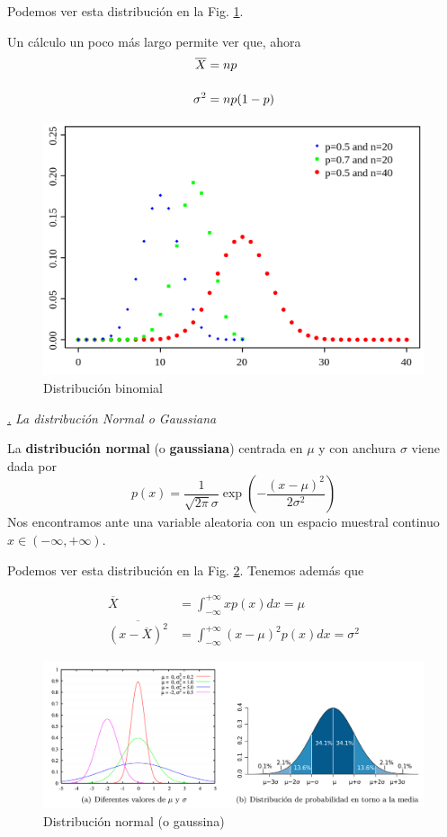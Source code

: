 \documentclass[a4paper,11pt]{book} %
\numberwithin{equation}{chapter}
\def\subsubiContadorIt{\par\addtocounter{subsubsection}{1}\underline{\it\thesubsubsection.}\hskip0.5cm \setcounter{subsubsubsectionIt}{0}}
\newcommand{\SubsubiIt}[1]{
		\subsubiContadorIt \textit{#1}
	}
\newcounter{subsubsubsectionIt}[subsubsection]
\begin{document}
Podemos ver esta distribución en la Fig. \ref{Fig_formalismo_dist_binomial}.

Un cálculo un poco más largo permite ver que, ahora
	\begin{equation} 
\begin{aligned}
	\overline X &=  np\\ \rule{0mm}{7mm}
	\sigma^2 &= n p(1-p)
	\end{aligned}
\end{equation}

	\begin{figure}[H]
	\centering 
	\includegraphics[width=0.4\linewidth]{Figuras/Fig_formalismo_dist_binomial.png}
	\caption{Distribución binomial}
	\label{Fig_formalismo_dist_binomial}
	\end{figure}

			\SubsubiIt{La distribución Normal o Gaussiana}

\begin{mybox_gray2}{}
La \textbf{distribución normal} (o \textbf{gaussiana}) centrada en $\mu$ y con anchura $\sigma$ viene dada por
	\begin{equation}
	p(x) = \frac{1}{\sqrt{2\pi}\sigma} \exp \left({-\frac{(x-\mu)^2}{2\sigma^2}}\right)
	\end{equation}
Nos encontramos ante una variable aleatoria con un espacio muestral continuo $x\in (-\infty,+\infty)$. 
\end{mybox_gray2}

Podemos ver esta distribución en la Fig. \ref{Fig_formalismo_dist_normal}. Tenemos además que

	\begin{equation} 
\begin{aligned}
	\overline{X} &= \int_{-\infty}^{+\infty} xp(x) dx = \mu \\
	\overline{(x-\overline X)^2} &= \int_{-\infty}^{+\infty} (x-\mu)^2 p(x)dx =\sigma^2
	\end{aligned}
\end{equation}

	\begin{figure}[H]
	\centering 
	\includegraphics[width=1\linewidth]{Figuras/Fig_subfig_formalismo_dist_normal.png}
	\caption{Distribución normal (o gaussina)}
	\label{Fig_formalismo_dist_normal}
	\end{figure}
\end{document}
